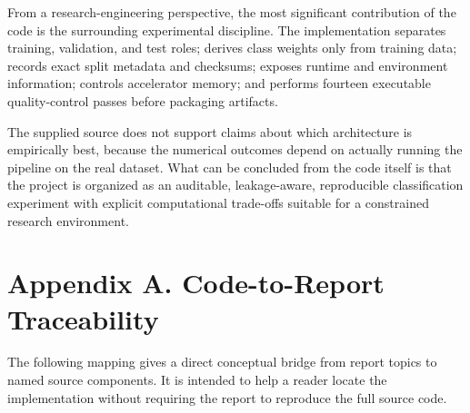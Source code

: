 \documentclass[11pt,a4paper]{article}
\begin{document}
From a research-engineering perspective, the most significant contribution of the code is the surrounding experimental discipline. The implementation separates training, validation, and test roles; derives class weights only from training data; records exact split metadata and checksums; exposes runtime and environment information; controls accelerator memory; and performs fourteen executable quality-control passes before packaging artifacts.

The supplied source does not support claims about which architecture is empirically best, because the numerical outcomes depend on actually running the pipeline on the real dataset. What can be concluded from the code itself is that the project is organized as an auditable, leakage-aware, reproducible classification experiment with explicit computational trade-offs suitable for a constrained research environment.

\section*{Appendix A. Code-to-Report Traceability}
The following mapping gives a direct conceptual bridge from report topics to named source components. It is intended to help a reader locate the implementation without requiring the report to reproduce the full source code.
\end{document}
